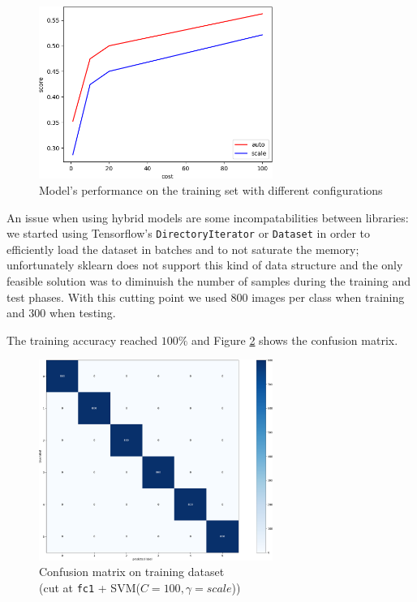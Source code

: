 \documentclass[compsoc]{IEEEtran}
\begin{document}
\begin{figure}[ht!]
\centering                                                                        
\includegraphics[width=3in]{../images/costs.png}
\captionsetup{justification=centering}                                                                                         
\caption{Model's performance on the training set with different configurations}
\label{fig:costs}                                                                                                                               
\end{figure}

An issue when using hybrid models are some incompatabilities between libraries: we started using Tensorflow's \texttt{DirectoryIterator} or \texttt{Dataset} in order to efficiently load the dataset in batches and to not saturate the memory; unfortunately sklearn does not support this kind of data structure and the only feasible solution was to diminuish the number of samples during the training and test phases. With this cutting point we used $800$ images per class when training and $300$ when testing. \par
The training accuracy reached $100\%$ and Figure \ref{fig:cm1-train} shows the confusion matrix. 


\begin{figure}[ht!]
\centering                                                                        
\includegraphics[width=3in]{../images/cm1-train.png}
\captionsetup{justification=centering}                                                                                         
\caption{Confusion matrix on training dataset \\ (cut at \texttt{fc1} + SVM($C=100, \gamma=scale$))}
\label{fig:cm1-train}                                                                                                                               
\end{figure}
\end{document}
